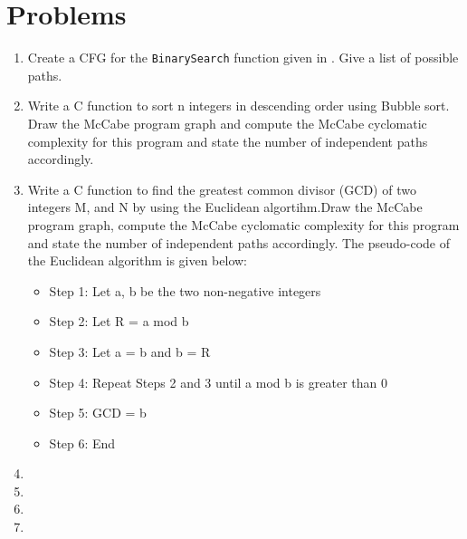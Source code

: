 \section{Problems}
\begin{enumerate}
    \item Create a CFG for the \lstinline!BinarySearch! function given in . Give a list of possible paths.
    \item Write a C function to sort n integers in descending order using Bubble sort. Draw the McCabe program graph and compute the McCabe cyclomatic complexity for this program and state the number of independent paths accordingly.
    \item Write a C function to find the greatest common divisor (GCD) of two integers M, and N by using the Euclidean algortihm.Draw the McCabe program graph, compute the McCabe cyclomatic complexity for this program and state the number of independent paths accordingly.
    The pseudo-code of the Euclidean algorithm is given below:
    \begin{itemize}
        \item Step 1: Let  a, b  be the two non-negative integers
        \item Step 2: Let R = a mod b 
        \item Step 3: Let  a = b  and  b = R
        \item Step 4: Repeat Steps 2 and 3 until  a mod b  is greater than 0
        \item Step 5: GCD = b
        \item Step 6: End
 \end{itemize}
    \item 
    \item 
    \item
    \item 
\end{enumerate}